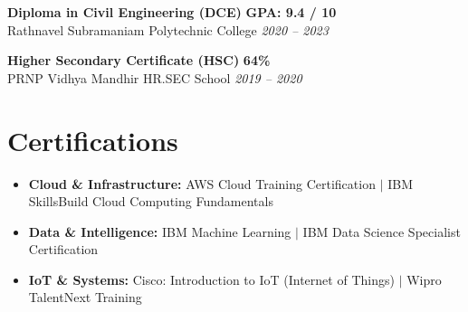 \documentclass[a4paper,11pt]{article}
\begin{document}
\vspace{3pt}
\noindent
\textbf{Diploma in Civil Engineering (DCE)} \hfill \textbf{GPA: 9.4 / 10} \\
Rathnavel Subramaniam Polytechnic College \hfill \textit{2020 -- 2023}

\vspace{3pt}
\noindent
\textbf{Higher Secondary Certificate (HSC)} \hfill \textbf{64\%} \\
PRNP Vidhya Mandhir HR.SEC School \hfill \textit{2019 -- 2020}

\section{Certifications}
\begin{itemize}
    \item \textbf{Cloud \& Infrastructure:} AWS Cloud Training Certification $|$ IBM SkillsBuild Cloud Computing Fundamentals
    \item \textbf{Data \& Intelligence:} IBM Machine Learning $|$ IBM Data Science Specialist Certification
    \item \textbf{IoT \& Systems:} Cisco: Introduction to IoT (Internet of Things) $|$ Wipro TalentNext Training
\end{itemize}
\end{document}
